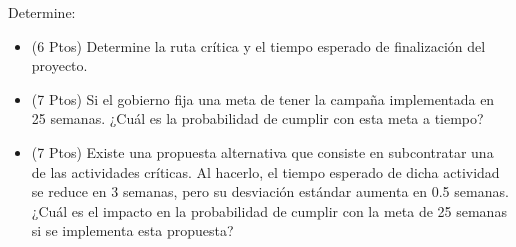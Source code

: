 \documentclass[11pt, a4paper]{article}
\begin{document}
  Determine:
  \begin{itemize}
    \item[\textbf{a)}] (6 Ptos) Determine la ruta crítica y el tiempo esperado de finalización del proyecto.
    \item[\textbf{b)}] (7 Ptos) Si el gobierno fija una meta de tener la campaña implementada en 25 semanas. ¿Cuál es la probabilidad de cumplir con esta meta a tiempo?
    \item[\textbf{c)}] (7 Ptos) Existe una propuesta alternativa que consiste en subcontratar una de las actividades críticas. Al hacerlo, el tiempo esperado de dicha actividad se reduce en 3 semanas, pero su desviación estándar aumenta en 0.5 semanas. ¿Cuál es el impacto en la probabilidad de cumplir con la meta de 25 semanas si se implementa esta propuesta?
  \end{itemize}
\end{document}
